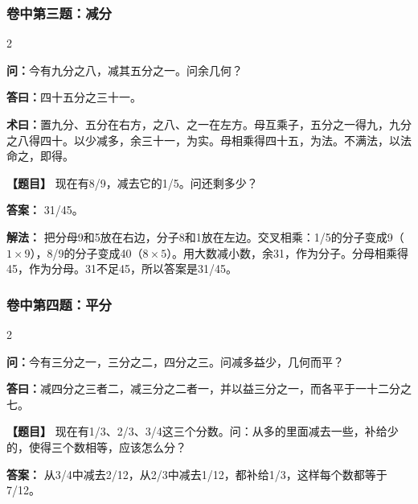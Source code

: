 \documentclass[11pt,a4paper]{article}
\begin{document}
\vspace{0.3cm}

\subsubsection*{卷中第三题：减分}
\begin{paracol}{2}
\begin{problemclassical}
\textbf{问：}今有九分之八，减其五分之一。问余几何？

\textbf{答曰：}四十五分之三十一。

\textbf{术曰：}置九分、五分在右方，之八、之一在左方。母互乘子，五分之一得九，九分之八得四十。以少减多，余三十一，为实。母相乘得四十五，为法。不满法，以法命之，即得。
\end{problemclassical}
\switchcolumn
\begin{problemmodern}
\textbf{【题目】} 现在有8/9，减去它的1/5。问还剩多少？

\textbf{答案：} 31/45。

\textbf{解法：} 把分母9和5放在右边，分子8和1放在左边。交叉相乘：1/5的分子变成9（$1 \times 9$），8/9的分子变成40（$8 \times 5$）。用大数减小数，余31，作为分子。分母相乘得45，作为分母。31不足45，所以答案是31/45。
\end{problemmodern}
\end{paracol}

\vspace{0.3cm}

\subsubsection*{卷中第四题：平分}
\begin{paracol}{2}
\begin{problemclassical}
\textbf{问：}今有三分之一，三分之二，四分之三。问减多益少，几何而平？

\textbf{答曰：}减四分之三者二，减三分之二者一，并以益三分之一，而各平于一十二分之七。
\end{problemclassical}
\switchcolumn
\begin{problemmodern}
\textbf{【题目】} 现在有1/3、2/3、3/4这三个分数。问：从多的里面减去一些，补给少的，使得三个数相等，应该怎么分？

\textbf{答案：} 从3/4中减去2/12，从2/3中减去1/12，都补给1/3，这样每个数都等于7/12。
\end{problemmodern}
\end{paracol}

\vspace{0.3cm}
\end{document}
